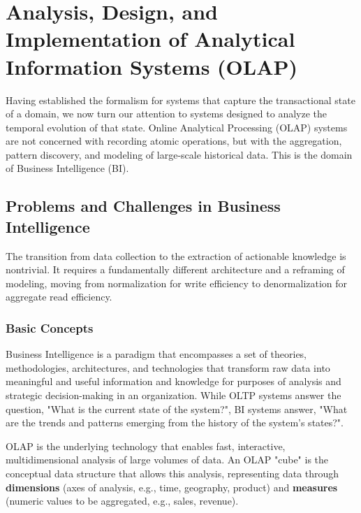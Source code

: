 \chapter{Analysis, Design, and Implementation of Analytical Information Systems (OLAP)}

Having established the formalism for systems that capture the transactional state of a domain, we now turn our attention to systems designed to analyze the temporal evolution of that state. Online Analytical Processing (OLAP) systems are not concerned with recording atomic operations, but with the aggregation, pattern discovery, and modeling of large-scale historical data. This is the domain of Business Intelligence (BI).

\section{Problems and Challenges in Business Intelligence}
The transition from data collection to the extraction of actionable knowledge is nontrivial. It requires a fundamentally different architecture and a reframing of modeling, moving from normalization for write efficiency to denormalization for aggregate read efficiency.

\subsection{Basic Concepts}
\begin{definition}
Business Intelligence is a paradigm that encompasses a set of theories, methodologies, architectures, and technologies that transform raw data into meaningful and useful information and knowledge for purposes of analysis and strategic decision-making in an organization. While OLTP systems answer the question, "What is the current state of the system?", BI systems answer, "What are the trends and patterns emerging from the history of the system's states?".
\end{definition}

\begin{definition}
OLAP is the underlying technology that enables fast, interactive, multidimensional analysis of large volumes of data. An OLAP "cube" is the conceptual data structure that allows this analysis, representing data through \textbf{dimensions} (axes of analysis, e.g., time, geography, product) and \textbf{measures} (numeric values to be aggregated, e.g., sales, revenue).
\end{definition}

